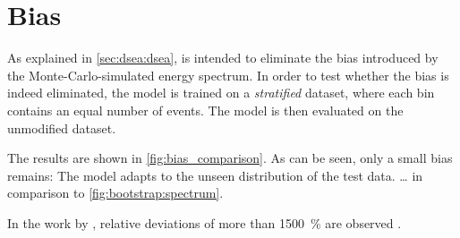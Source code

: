 \section{Bias}
As explained in \autoref{sec:dsea:dsea},
\dsea{} is intended to eliminate the bias introduced by the Monte-Carlo-simulated energy spectrum.
%
In order to test
whether the bias is indeed eliminated,
the model is trained on a \emph{stratified} dataset,
    where each bin contains an equal number of events.
The model is then evaluated on the unmodified dataset.

The results are shown in \autoref{fig:bias_comparison}.
As can be seen,
only a small bias remains:
The model adapts to the unseen distribution of the test data.
… in comparison to \autoref{fig:bootstrap:spectrum}.

In the work by \citeauthor{dsea_samuel},
relative deviations of more than \SI{1500}{\percent} are observed \cite{dsea_samuel}.


